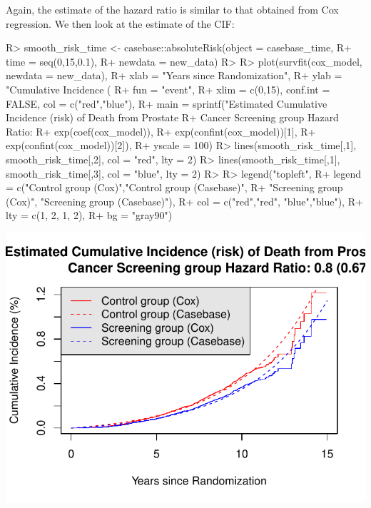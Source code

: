 \documentclass[
]{jss}
\begin{document}
Again, the estimate of the hazard ratio is similar to that obtained from
Cox regression. We then look at the estimate of the CIF:

\begin{CodeChunk}

\begin{CodeInput}
R> smooth_risk_time <- casebase::absoluteRisk(object = casebase_time, 
R+                                           time = seq(0,15,0.1), 
R+                                           newdata = new_data)
R> 
R> plot(survfit(cox_model, newdata = new_data),
R+      xlab = "Years since Randomization", 
R+      ylab = "Cumulative Incidence (%
R+      fun = "event",
R+      xlim = c(0,15), conf.int = FALSE, col = c("red","blue"), 
R+      main = sprintf("Estimated Cumulative Incidence (risk) of Death from Prostate 
R+                     Cancer Screening group Hazard Ratio: %
R+                     exp(coef(cox_model)), 
R+                     exp(confint(cox_model))[1], 
R+                     exp(confint(cox_model))[2]),
R+      yscale = 100)
R> lines(smooth_risk_time[,1], smooth_risk_time[,2], col = "red", lty = 2)
R> lines(smooth_risk_time[,1], smooth_risk_time[,3], col = "blue", lty = 2)
R> 
R> legend("topleft", 
R+        legend = c("Control group (Cox)","Control group (Casebase)",
R+                   "Screening group (Cox)", "Screening group (Casebase)"), 
R+        col = c("red","red", "blue","blue"),
R+        lty = c(1, 2, 1, 2), 
R+        bg = "gray90")
\end{CodeInput}


\begin{center}\includegraphics{../figures/erspc-casebase-weibull-cif-1} \end{center}

\end{CodeChunk}
\end{document}
